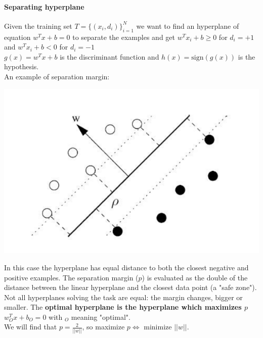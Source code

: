 \documentclass[10pt]{report}
\begin{document}
\paragraph{Separating hyperplane} Given the training set $T = \{(x_i, d_i)\}_{i=1}^N$ we want to find an hyperplane of equation $w^Tx + b = 0$ to separate the examples and get $w^Tx_i + b \geq 0$ for $d_i = +1$ and $w^Tx_i + b < 0$ for $d_i = -1$\\
$g(x) = w^Tx + b$ is the discriminant function and $h(x) = \text{sign}(g(x))$ is the hypothesis.\\
An example of separation margin:
\begin{center}
	\includegraphics[scale=0.5]{18.png}
\end{center}
In this case the hyperplane has equal distance to both the closest negative and positive examples. The separation margin ($p$) is evaluated as the double of the distance between the linear hyperplane and the closest data point (a "safe zone"). Not all hyperplanes solving the task are equal: the margin changes, bigger or smaller. The \textbf{optimal hyperplane is the hyperplane which maximizes $p$} $w_O^Tx + b_O = 0$ with $_O$ meaning "optimal".\\
We will find that $p = \frac{2}{||w||}$, so maximize $p\Leftrightarrow$ minimize $||w||$.
\end{document}

